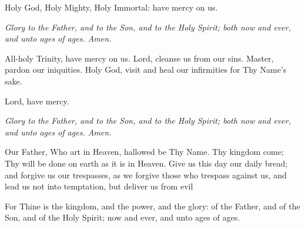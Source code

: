 
Holy God, Holy Mighty, Holy Immortal: have mercy on us. 

\vbox{}
\emph{Glory to the Father, and to the Son, and to the Holy Spirit; both now and ever, and
unto ages of ages. Amen.}

\vbox{}
All-holy Trinity, have mercy on us. Lord, cleanse us from our sins. Master, pardon
our iniquities. Holy God, visit and heal our infirmities for Thy Name’s sake.

\vbox{}
Lord, have mercy. 

\vbox{}
\emph{Glory to the Father, and to the Son, and to the Holy Spirit; both now and ever, and
unto ages of ages. Amen.}

\vbox{}
Our Father, Who art in Heaven, hallowed be Thy Name. Thy kingdom come; Thy
will be done on earth as it is in Heaven. Give us this day our daily bread; and forgive
us our trespasses, as we forgive those who trespass against us, and lead us not into
temptation, but deliver us from evil

\begin{priest}
\item For Thine is the kingdom, and the power, and the glory:
    of the Father, and of the Son, and of the Holy Spirit; now and ever, and unto ages of ages.
\end{priest}
